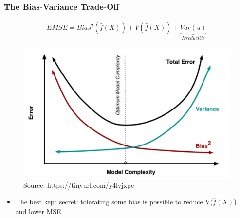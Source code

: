 \documentclass[
  shownotes,
  xcolor={svgnames},
  hyperref={colorlinks,citecolor=DarkBlue,linkcolor=andesred,urlcolor=DarkBlue}
  , aspectratio=169]{beamer}
\begin{document}

\begin{frame}
\frametitle{The Bias-Variance Trade-Off}

\begin{align}
  EMSE = Bias^2 (\hat f(X))+V (\hat f(X)) +\underset{Irreducible}{\underbrace{Var(u)}}
\end{align}



\begin{figure}[H] \centering
  \centering
  \includegraphics[scale=0.35]{figures/medium_bias_variance_trade_off.png}
  \\
  \tiny
  Source: https://tinyurl.com/y4lvjxpc
\end{figure}
\begin{itemize}
  
  \item The best kept secret: tolerating some bias is possible to reduce V($\hat f(X)$) and lower MSE
  
\end{itemize}
\end{frame}
\end{document}
